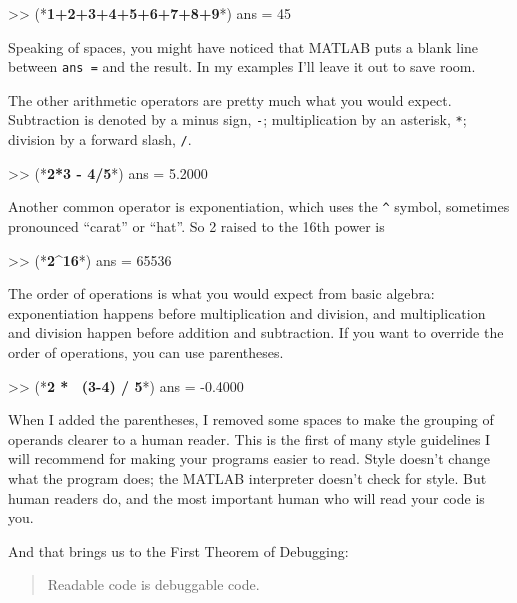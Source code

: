 \begin{code}
>> (*\textbf{1+2+3+4+5+6+7+8+9}*)
ans = 45
\end{code}

Speaking of spaces, you might have noticed that MATLAB puts a blank
line between \lstinline{ans =} and the result.  In my examples I'll leave it out to save room.


The other arithmetic operators are pretty much what you would expect.
Subtraction is denoted by a minus sign, \lstinline{-}; multiplication by
an asterisk, \lstinline{*}; division by a forward slash, \lstinline{/}.

\begin{code}
>> (*\textbf{2*3 - 4/5}*)
ans = 5.2000
\end{code}

Another common operator is exponentiation, which uses the \verb+^+
symbol, sometimes pronounced ``carat'' or ``hat''.  So 2 raised to the
16th power is

\begin{code}
>> (*\textbf{2\^{}16}*)
ans = 65536
\end{code}

The order of operations is what you would expect from basic algebra:
exponentiation happens before multiplication and division, and multiplication and division happen before addition and subtraction.
If you want to override the order of operations, you can use parentheses.


\begin{code}
>> (*\textbf{2 * ~(3-4) / 5}*)
ans = -0.4000
\end{code}

When I added the parentheses, I removed some spaces to make the
grouping of operands clearer to a human reader.  This is the first
of many style guidelines I will recommend for making your programs
easier to read.  Style doesn't change what the program does; the MATLAB
interpreter doesn't check for style.  But human readers do, and the
most important human who will read your code is you.


And that brings us to the First Theorem of Debugging:

\begin{quote}
Readable code is debuggable code.
\end{quote}

